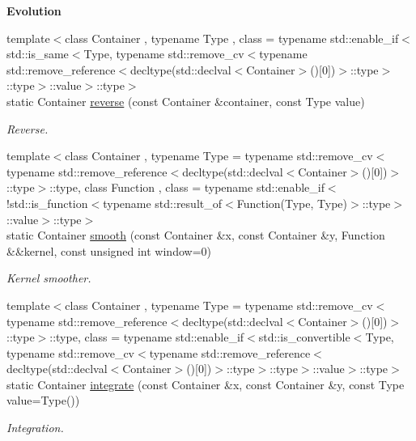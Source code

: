 \begin{Indent}{\bf Evolution}\par
\begin{DoxyCompactItemize}
\item 
{\footnotesize template$<$class Container , typename Type , class  = typename std\-::enable\-\_\-if$<$std\-::is\-\_\-same$<$\-Type, typename std\-::remove\-\_\-cv$<$typename std\-::remove\-\_\-reference$<$decltype(std\-::declval$<$\-Container$>$()\mbox{[}0\mbox{]})$>$\-::type$>$\-::type$>$\-::value$>$\-::type$>$ }\\static Container \hyperlink{exceptionUtility_a2bb90553f0ec2abbe3c607acf0004e99}{reverse} (const Container \&container, const Type value)
\begin{DoxyCompactList}\small\item\em Reverse. \end{DoxyCompactList}\item 
{\footnotesize template$<$class Container , typename Type  = typename std\-::remove\-\_\-cv$<$typename std\-::remove\-\_\-reference$<$decltype(std\-::declval$<$\-Container$>$()\mbox{[}0\mbox{]})$>$\-::type$>$\-::type, class Function , class  = typename std\-::enable\-\_\-if$<$!std\-::is\-\_\-function$<$typename std\-::result\-\_\-of$<$\-Function(\-Type, Type)$>$\-::type$>$\-::value$>$\-::type$>$ }\\static Container \hyperlink{exceptionUtility_a7e953fd91eb9a9a159f84e71d73dab01}{smooth} (const Container \&x, const Container \&y, Function \&\&kernel, const unsigned int window=0)
\begin{DoxyCompactList}\small\item\em Kernel smoother. \end{DoxyCompactList}\item 
{\footnotesize template$<$class Container , typename Type  = typename std\-::remove\-\_\-cv$<$typename std\-::remove\-\_\-reference$<$decltype(std\-::declval$<$\-Container$>$()\mbox{[}0\mbox{]})$>$\-::type$>$\-::type, class  = typename std\-::enable\-\_\-if$<$std\-::is\-\_\-convertible$<$\-Type, typename std\-::remove\-\_\-cv$<$typename std\-::remove\-\_\-reference$<$decltype(std\-::declval$<$\-Container$>$()\mbox{[}0\mbox{]})$>$\-::type$>$\-::type$>$\-::value$>$\-::type$>$ }\\static Container \hyperlink{exceptionUtility_afbcab706073359d7f0e80aa84bf99b54}{integrate} (const Container \&x, const Container \&y, const Type value=Type())
\begin{DoxyCompactList}\small\item\em Integration. \end{DoxyCompactList}\item 

\end{DoxyCompactItemize}
\end{Indent}
